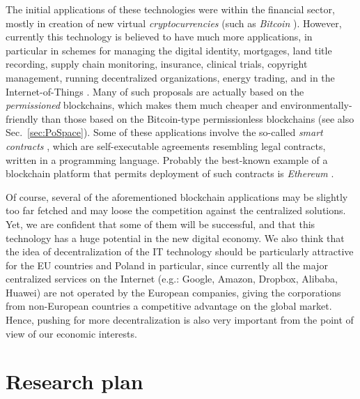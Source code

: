 \documentclass{article}
\begin{document}
The initial applications of these technologies were within the financial sector, mostly in creation of new virtual \emph{cryptocurrencies} (such as \emph{Bitcoin} \cite{nakamoto2008bitcoin}). However, currently this technology is believed to have much more applications, in particular in schemes for managing the digital identity, mortgages, land title recording, supply chain monitoring, insurance, 
clinical trials, copyright management, running decentralized organizations, energy trading, and in the Internet-of-Things \cite{econ3,forbes,econ2,Underwood:2016:BBB:3013530.2994581,EY,ibm,Microsoft5,DHL,chamber,capgemini,pwc,EY,DHL,iot,economist-dao,pwc2}. Many of such proposals are actually based on the \emph{permissioned} blockchains, which makes them much cheaper and environmentally-friendly than those based on the Bitcoin-type permissionless blockchains (see also Sec.~\ref{sec:PoSpace}). Some of these applications involve the so-called \emph{smart contracts} \cite{Szabo}, which are self-executable agreements resembling legal contracts, written in a programming language. Probably the best-known example of a blockchain platform that permits deployment of such contracts is \emph{Ethereum} \cite{Ethereum}. 

Of course, several of the aforementioned blockchain applications may be slightly too far fetched and may loose the competition against the centralized solutions. Yet, we are confident that some of them will be successful, and that this technology has a huge potential in the new digital economy. We also think that the idea of decentralization of the IT technology should be particularly attractive for the EU countries and Poland in particular, since currently all the major centralized services on the Internet (e.g.: Google, Amazon, Dropbox, Alibaba, Huawei) are not operated by the European companies, giving the corporations from non-European countries a competitive advantage on the global market. Hence, pushing for more decentralization is also very important from the point of view of our economic interests.

\section{Research plan}
\end{document}
